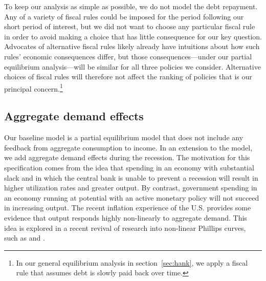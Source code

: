 \documentclass[\econtexRoot/HAFiscal]{subfiles}
\begin{document}
To keep our analysis as simple as possible, we do not model the debt repayment.
Any of a variety of fiscal rules could be imposed for the period following our short period of interest, but we did not want to choose any particular fiscal rule in order to avoid making a choice that has little consequence for our key question.
Advocates of alternative fiscal rules likely already have intuitions about how such rules' economic consequences differ, but those consequences---under our partial equilibrium analysis---will be similar for all three policies we consider.
Alternative choices of fiscal rules will therefore not affect the ranking of policies that is our principal concern.\footnote{In our general equilibrium analysis in section~\ref{sec:hank}, we apply a fiscal rule that assumes debt is slowly paid back over time.}


\hypertarget{aggregate-demand-effects}{}\par\subsection{Aggregate demand effects}
\notinsubfile{\label{sec:ADeffects}}

Our baseline model is a partial equilibrium model that does not include any feedback from aggregate consumption to income.
In an extension to the model, we add aggregate demand effects during the recession.
The motivation for this specification comes from the idea that spending in an economy with substantial slack and in which the central bank is unable to prevent a recession will result in higher utilization rates and greater output.
By contrast, government spending in an economy running at potential with an active monetary policy will not succeed in increasing output.
The recent inflation experience of the U.S.
provides some evidence that output responds highly non-linearly to aggregate demand.
This idea is explored in a recent revival of research into non-linear Phillips curves, such as \cite{benigno2023baaack} and \cite{blanco2024nonlinear}.
\end{document}
